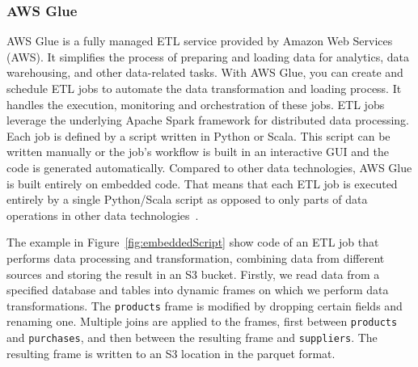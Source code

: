 \subsubsection{AWS Glue}
AWS Glue is a fully managed ETL service provided by Amazon Web Services (AWS). It simplifies the process of preparing and loading data for analytics, data warehousing, and other data-related tasks. With AWS Glue, you can create and schedule ETL jobs to automate the data transformation and loading process. It handles the execution, monitoring and orchestration of these jobs. ETL jobs leverage the underlying Apache Spark framework for distributed data processing. Each job is defined by a script written in Python or Scala. This script can be written manually or the job's workflow is built in an interactive GUI and the code is generated automatically. Compared to other data technologies, AWS Glue is built entirely on embedded code. That means that each ETL job is executed entirely by a single Python/Scala script as opposed to only parts of data operations in other data technologies~\cite{awsglueintro}.
\par
The example in Figure~\ref{fig:embeddedScript} show code of an ETL job that performs data processing and transformation, combining data from different sources and storing the result in an S3 bucket. Firstly, we read data from a specified database and tables into dynamic frames on which we perform data transformations. The \texttt{products} frame is modified by dropping certain fields and renaming one. Multiple joins are applied to the frames, first between \texttt{products} and \texttt{purchases}, and then between the resulting frame and \texttt{suppliers}. The resulting frame is written to an S3 location in the parquet format.

